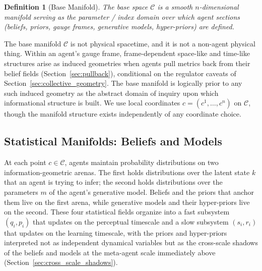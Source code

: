 \documentclass[11pt]{article}
\newtheorem{definition}{Definition}
\begin{document}
\begin{definition}[Base Manifold]
\label{def:base_manifold}
The base space $\mathcal{C}$ is a smooth $n$-dimensional manifold serving as the parameter / index domain over which agent sections (beliefs, priors, gauge frames, generative models, hyper-priors) are defined.
\end{definition}

The base manifold $\mathcal{C}$ is not physical spacetime, and it is not a non-agent physical thing. Within an agent's gauge frame, frame-dependent space-like and time-like structures arise as induced geometries when agents pull metrics back from their belief fields (Section~\ref{sec:pullback}), conditional on the regulator caveats of Section~\ref{sec:collective_geometry}. The base manifold is logically prior to any such induced geometry as the abstract domain of inquiry upon which informational structure is built. We use local coordinates $c = (c^1, \ldots, c^n)$ on $\mathcal{C}$, though the manifold structure exists independently of any coordinate choice.

\subsection{Statistical Manifolds: Beliefs and Models}
\label{sec:statistical_manifolds}

At each point $c \in \mathcal{C}$, agents maintain probability distributions on two information-geometric arenas. The first holds distributions over the latent state $k$ that an agent is trying to infer; the second holds distributions over the parameters $m$ of the agent's generative model. Beliefs and the priors that anchor them live on the first arena, while generative models and their hyper-priors live on the second. These four statistical fields organize into a fast subsystem $(q_i, p_i)$ that updates on the perceptual timescale and a slow subsystem $(s_i, r_i)$ that updates on the learning timescale, with the priors and hyper-priors interpreted not as independent dynamical variables but as the cross-scale shadows of the beliefs and models at the meta-agent scale immediately above (Section~\ref{sec:cross_scale_shadows}).
\end{document}
